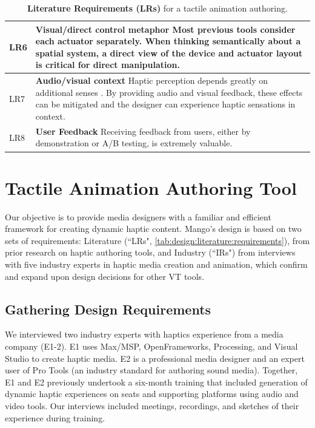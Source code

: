 \begin{table}
\begin{tabular}{|l|p{}|}
		LR6 &
		\textbf{Visual/direct control metaphor}
		\cite{Kim2009,Paneels2013,Cuartielles2012}
		 Most previous tools consider each actuator separately.
		 When thinking semantically about a spatial system, a direct view of the device and actuator layout is critical for direct manipulation.
	\\
	\hline
		LR7 &
		\textbf{Audio/visual context}
		\cite{Kim2009,Swindells2014,Moussette2011}
		 Haptic perception depends greatly on additional senses \cite{Hayward2008}. %
		By providing audio and visual feedback, these effects can be mitigated and the designer can experience haptic sensations in context.
	\\
	\hline
		LR8 &
		\textbf{User Feedback}
		 \cite{Schneider2014,Swindells2014}
		 Receiving feedback from users, either by demonstration or A/B testing, is extremely valuable.
	\\
	

	\hline
	\end{tabular}
	\caption{{\bf Literature Requirements (LRs)} for a tactile animation authoring.}
	\label{tab:design:literature:requirements}
\end{table}






%
%
\section{Tactile Animation Authoring Tool}
Our objective is to provide media designers with a familiar and efficient %
framework for creating dynamic haptic content. Mango's design is based on two sets of requirements: Literature  (``LRs", \autoref{tab:design:literature:requirements}), from prior research on haptic authoring tools, and Industry (``IRs") from interviews with five industry experts in haptic media creation and animation, which confirm and expand upon design decisions for other VT tools.

\subsection{Gathering Design Requirements}
We interviewed two industry experts with haptics experience from a media company (E1-2).
E1 %
uses Max/MSP, OpenFrameworks, Processing, and Visual Studio to create haptic media.
E2 is a professional media designer and an expert user of Pro Tools (an industry standard for authoring sound media).  Together, E1 and E2 previously undertook 
a six-month training that included generation of dynamic haptic experiences on seats and supporting platforms using audio and video tools.
Our interviews included meetings, recordings, and sketches of their experience during training.

